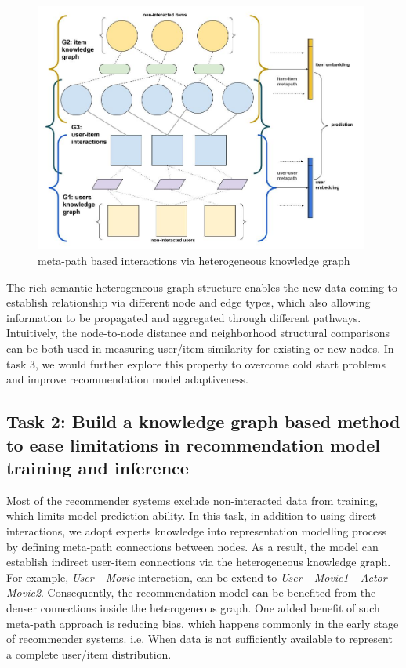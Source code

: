 \begin{figure}[!ht]
    \centering
    \includegraphics[width=0.98\textwidth]{figs/meta-embedding.jpg}
    \caption{meta-path based interactions via heterogeneous knowledge graph}\label{fig:meta_task}
\end{figure}

The rich semantic heterogeneous graph structure enables the new data coming to establish relationship via different node and edge types, which also allowing information to be propagated and aggregated through different pathways. 
Intuitively, the node-to-node distance and neighborhood structural comparisons can be both used in measuring user/item similarity for existing or new nodes. In task 3, we would further explore this property to overcome cold start problems and improve recommendation model adaptiveness.


\subsection{Task 2: Build a knowledge graph based method to ease limitations in recommendation model training and inference}

Most of the recommender systems exclude non-interacted data from training, which limits model prediction ability. In this task, in addition to using direct interactions, we adopt experts knowledge into representation modelling process by defining meta-path connections between nodes. As a result, the model can establish indirect user-item connections via the heterogeneous knowledge graph. For example, \textit{User - Movie} interaction, can be extend to \textit{User - Movie1 - Actor - Movie2}. Consequently, the recommendation model can be benefited from the denser connections inside the heterogeneous graph. One added benefit of such meta-path approach is reducing bias, which happens commonly in the early stage of recommender systems. i.e. When data is not sufficiently available to represent a complete user/item distribution.

